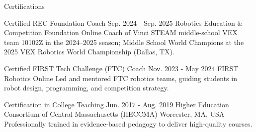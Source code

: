 \documentclass{resume} %
\begin{document}
\begin{rSection}{Certifications}

\begin{hSubsection}
{Certified REC Foundation Coach}
{Sep. 2024 - Sep. 2025}
{Robotics Education \& Competition Foundation}
{Online}
{Coach of Vinci STEAM middle-school VEX team 10102Z in the 2024--2025 season; Middle School World Champions at the 2025 VEX Robotics World Championship (Dallas, TX).}
\end{hSubsection}

\begin{hSubsection}
{Certified FIRST Tech Challenge (FTC) Coach}
{Nov. 2023 - May 2024}
{FIRST Robotics}
{Online}
{Led and mentored FTC robotics teams, guiding students in robot design, programming, and competition strategy.}
\end{hSubsection}

\begin{hSubsection}
{Certification in College Teaching}
{Jun. 2017 - Aug. 2019}
{Higher Education Consortium of Central Massachusetts (HECCMA)}
{Worcester, MA, USA}
{Professionally trained in evidence-based pedagogy to deliver high-quality courses.}
\end{hSubsection}

\end{rSection}
\end{document}
